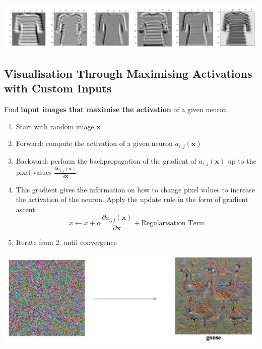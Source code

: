 \documentclass[11pt]{article}
\begin{document}
\begin{center}
	\includegraphics[width=0.8\linewidth]{img/activation_maps_output}
\end{center}

\subsection{Visualisation Through Maximising Activations with Custom Inputs}
Find \textbf{input images that maximise the activation} of a given neuron
\begin{enumerate}
	\item Start with random image $\textbf{x}$
	\item Forward: compute the activation of a given neuron $a_{i,j}(\textbf{x})$
	\item Backward: perform the backpropagation of the gradient of $a_{i,j}(\textbf{x})$ up to the pixel values $\frac{\partial a_{i,j}(\textbf{x})}{\partial\textbf{x}}$
	\item This gradient gives the information on how to change pixel values to increase the activation of the neuron. Apply the update rule in the form of gradient ascent:
	\begin{equation*}
		x\leftarrow x+ \alpha \frac{\partial a_{i,j}(\textbf{x})}{\partial\textbf{x}} + \text{Regularisation Term}
	\end{equation*}
	\item Iterate from 2. until convergence
\end{enumerate}

\begin{center}
	\includegraphics[width=0.6\linewidth, keepaspectratio]{img/activation_maps_gradient_ascent}
\end{center}
\end{document}
